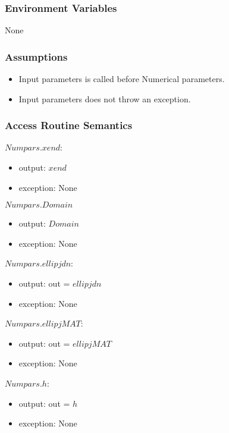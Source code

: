 \documentclass[12pt, titlepage]{article}
\begin{document}
\subsubsection{Environment Variables}

None

\subsubsection{Assumptions}

\begin{itemize}
	\item Input parameters is called before Numerical parameters. 
	\item Input parameters does not throw an exception. 
\end{itemize}

\subsubsection{Access Routine Semantics}


$Numpars.xend$:
\begin{itemize}
	\item output: $xend$ 
	\item exception: None
\end{itemize}


\noindent $Numpars.Domain$
\begin{itemize} 
	\item output: $Domain$ 
	\item exception: None
\end{itemize} 

\noindent $Numpars.ellipjdn$:
\begin{itemize}
	\item output: out = $ellipjdn$
	\item exception: None 
\end{itemize}

\noindent $Numpars.ellipjMAT$:
\begin{itemize}
	\item output: out = $ellipjMAT$
	\item exception: None
\end{itemize}

\noindent $Numpars.h$:
\begin{itemize}
	\item output: out = $h$ 
	\item exception: None
\end{itemize} 
\end{document}

